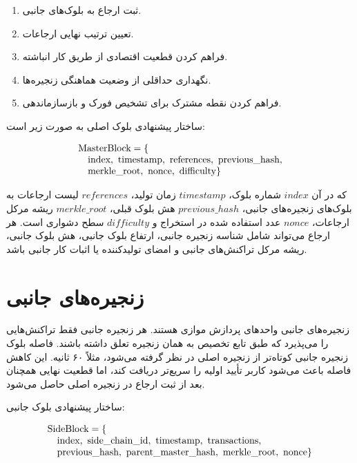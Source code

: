 \begin{enumerate}
\item ثبت ارجاع به بلوک‌های جانبی.
\item تعیین ترتیب نهایی ارجاعات.
\item فراهم کردن قطعیت اقتصادی از طریق کار انباشته.
\item نگهداری حداقلی از وضعیت هماهنگی زنجیره‌ها.
\item فراهم کردن نقطه مشترک برای تشخیص فورک و بازسازماندهی.
\end{enumerate}

ساختار پیشنهادی بلوک اصلی به صورت زیر است:

\begin{latin}
\begin{equation}
\begin{array}{@{}l@{}}
\text{MasterBlock} = \{ \\
\quad \text{index},\ \text{timestamp},\ \text{references},\ \text{previous\_hash}, \\
\quad \text{merkle\_root},\ \text{nonce},\ \text{difficulty}\}
\end{array}
\end{equation}
\end{latin}

که در آن \(index\) شماره بلوک، \(timestamp\) زمان تولید، \(references\) لیست ارجاعات به بلوک‌های زنجیره‌های جانبی، \(previous\_hash\) هش بلوک قبلی، \(merkle\_root\) ریشه مرکل ارجاعات، \(nonce\) عدد استفاده شده در استخراج و \(difficulty\) سطح دشواری است. هر ارجاع می‌تواند شامل شناسه زنجیره جانبی، ارتفاع بلوک جانبی، هش بلوک جانبی، ریشه مرکل تراکنش‌های جانبی و امضای تولیدکننده یا اثبات کار جانبی باشد.

\section{زنجیره‌های جانبی}

زنجیره‌های جانبی واحدهای پردازش موازی هستند. هر زنجیره جانبی فقط تراکنش‌هایی را می‌پذیرد که طبق تابع تخصیص به همان زنجیره تعلق داشته باشند. فاصله بلوک زنجیره جانبی کوتاه‌تر از زنجیره اصلی در نظر گرفته می‌شود، مثلاً ۶۰ ثانیه. این کاهش فاصله باعث می‌شود کاربر تأیید اولیه را سریع‌تر دریافت کند، اما قطعیت نهایی همچنان بعد از ثبت ارجاع در زنجیره اصلی حاصل می‌شود.

ساختار پیشنهادی بلوک جانبی:

\begin{latin}
\begin{equation}
\begin{array}{@{}l@{}}
\text{SideBlock} = \{ \\
\quad \text{index},\ \text{side\_chain\_id},\ \text{timestamp},\ \text{transactions}, \\
\quad \text{previous\_hash},\ \text{parent\_master\_hash},\ \text{merkle\_root},\ \text{nonce}\}
\end{array}
\end{equation}
\end{latin}

